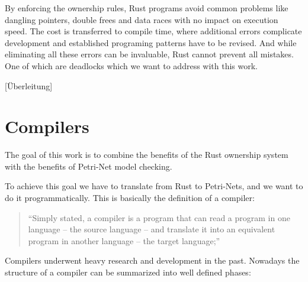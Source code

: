 By enforcing the ownership rules, Rust programs avoid common problems like dangling pointers, double frees and data races\cite{Matsakis:2014:RL:2692956.2663188} with no impact on execution speed.
The cost is transferred to compile time, where additional errors complicate development and established programing patterns have to be revised.
And while eliminating all these errors can be invaluable, Rust cannot prevent all mistakes.
One of which are deadlocks\cite[Chapter 8.1]{nomicon} which we want to address with this work.

[Überleitung]

\section{Compilers}
The goal of this work is to combine the benefits of the Rust ownership system with the benefits of Petri-Net model checking.

To achieve this goal we have to translate from Rust to Petri-Nets, 
and we want to do it programmatically.
This is basically the definition of a compiler\cite[Chapter 1.1]{aho1986compilers}:
\begin{quote}
``Simply stated, a compiler is a program that can read a program in one language -- the source language -- and translate it into an equivalent program in another language -- the target language;''
\end{quote}

Compilers underwent heavy research and development in the past.
Nowadays the structure of a compiler can be summarized into well defined phases\cite[Chapter 1.2]{aho1986compilers}:

